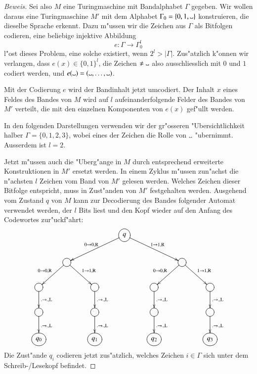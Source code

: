 \begin{proof}[Beweis]
Sei also $M$ eine Turingmaschine mit Bandalphabet $\Gamma$ gegeben. Wir
wollen daraus eine Turingmaschine $M'$ mit dem Alphabet
$\Gamma_0= \{0,1,\blank\}$ konstruieren, die dieselbe
Sprache erkennt. Dazu m"ussen wir die Zeichen aus $\Gamma$ als
Bitfolgen codieren, eine beliebige injektive Abbildung
\[
e\colon\Gamma\to \Gamma_0^l
\]
l"ost dieses Problem, eine solche existiert, wenn $2^l>|\Gamma|$.
Zus"atzlich k"onnen
wir verlangen, dass $e(x)\in \{0,1\}^l$, die Zeichen $\ne\blank$
also ausschliesslich mit $0$ und $1$ codiert werden, und
$e(\blank)=(\blank,\dots,\blank)$.

Mit der Codierung $e$ wird der Bandinhalt jetzt umcodiert. Der Inhalt
$x$
eines Feldes des Bandes von $M$ wird auf $l$ aufeinanderfolgende Felder
des Bandes von $M'$ verteilt, die mit den einzelnen Komponenten
von $e(x)$ gef"ullt werden.

In den folgenden Darstellungen verwenden wir der gr"osseren
"Ubersichtlichkeit halber $\Gamma=\{0,1,2,3\}$, wobei eines der
Zeichen die Rolle von $\blank$ "ubernimmt. Ausserdem ist $l=2$.

Jetzt m"ussen auch die "Uberg"ange in $M$
durch entsprechend erweiterte Konstruktionen in $M'$ ersetzt werden.
In einem Zyklus m"ussen zun"achst die n"achsten $l$ Zeichen vom Band
von $M'$ gelesen werden. Welches Zeichen dieser Bitfolge entspricht,
muss in Zust"anden von $M'$ festgehalten werden. Ausgehend vom Zustand
$q$ von $M$ kann zur Decodierung
des Bandes folgender Automat verwendet werden, der $l$ Bits liest
und den Kopf wieder auf den Anfang des Codewortes zur"uckf"ahrt:
\[
\entrymodifiers={++[o][F]}
\xymatrix{
*+\txt{}
	&*+\txt{}
		&*+\txt{}
			&q\ar[dll]_{0\to 0,\text{R}} \ar[drr]^{1\to 1,\text{R}}
\\
*+\txt{}
	&\ar[dl]_{0\to 0,\text{R}} \ar[dr]^{1\to 1,\text{R}}
		&*+\txt{}
			&*+\txt{}
				&*+\txt{}
					&\ar[dl]_{0\to 0,\text{R}} \ar[dr]^{1\to 1,\text{R}}
						&*+\txt{}
\\
\ar[d]^{.\to .,\text{L}}
	&*+\txt{}
		&\ar[d]^{.\to .,\text{L}}
			&*+\txt{}
				&\ar[d]^{.\to .,\text{L}}
					&*+\txt{}
						&\ar[d]^{.\to .,\text{L}}
\\
\ar[d]^{.\to .,\text{L}}
	&*+\txt{}
		&\ar[d]^{.\to .,\text{L}}
			&*+\txt{}
				&\ar[d]^{.\to .,\text{L}}
					&*+\txt{}
						&\ar[d]^{.\to .,\text{L}}
\\
q_0
	&*+\txt{}
		&q_1
			&*+\txt{}
				&q_2
					&*+\txt{}
						&q_3
}
\]
Die Zust"ande $q_i$ codieren jetzt zus"atzlich, welches
Zeichen $i\in\Gamma$ sich unter dem Schreib-/Lesekopf befindet.


\end{proof}
